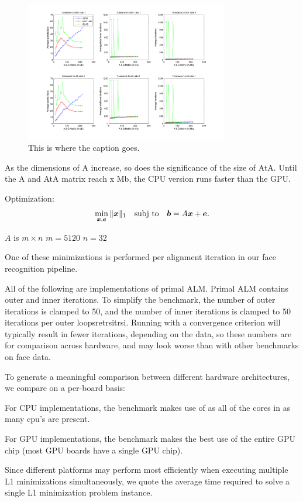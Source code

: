 \documentclass[10pt,twocolumn,letterpaper]{article}
\begin{document}
\begin{figure}
\centering
\includegraphics[width=3.5in]{figures/PALM_benchmark_ratio_1.png}
\caption{This is where the caption goes.}
\label{fig:uniqueidentifierforthisimage}
\end{figure}

As the dimensions of A increase, so does the significance of the size of AtA.  Until the A and AtA matrix reach x Mb, the CPU version runs faster than the GPU.  

Optimization:
\begin{equation}
\min_{{\boldsymbol{x}}, \boldsymbol{e}} \|{\boldsymbol{x}}\|_1 \quad \textup{subj to} \quad \boldsymbol{b} = A {\boldsymbol{x}} + \boldsymbol{e}.
\end{equation}

$A$ is $m \times n$
$m = 5120$
$n = 32$

One of these minimizations is performed per 
alignment iteration in our face recognition pipeline.

All of the following are implementations of primal ALM.
Primal ALM contains outer and inner iterations.
To simplify the benchmark, the number of outer iterations
is clamped to 50, and the number of inner iterations is
clamped to 50 iterations per outer loopsretrsitrsi.  Running with
a convergence criterion will typically result in fewer
iterations, depending on the data, so these numbers are
for comparison across hardware, and may look worse than
with other benchmarks on face data.

To generate a meaningful comparison between different hardware
architectures, we compare on a per-board basis:

For CPU implementations, the benchmark makes use of
as all of the cores in as many cpu's are present.

For GPU implementations, the benchmark makes the best use
of the entire GPU chip (most GPU boards have a single GPU chip).

Since different platforms may perform most efficiently when
executing multiple L1 minimizations simultaneously,
we quote the average time required to solve a single L1
minimization problem instance.
\end{document}
